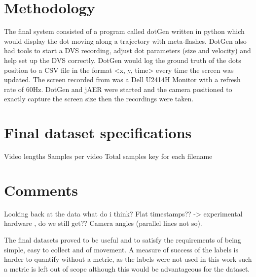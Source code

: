 \section{Methodology}
The final system consisted of a program called dotGen written in python which would display the dot moving along a trajectory with meta-flashes.
DotGen also had tools to start a DVS recording, adjust dot parameters (size and velocity) and help set up the DVS correctly. 
DotGen would log the ground truth of the dots position to a CSV file in the format <x, y, time> every time the screen was updated.
The screen recorded from was a Dell U2414H Monitor with a refresh rate of 60Hz.
DotGen and jAER were started and the camera positioned to exactly capture the screen size then the recordings were taken. 




\section{Final dataset specifications}
Video lengths \hfill
Samples per video \hfill
Total samples \hfill
key for each filename \hfill


\section{Comments}
Looking back at the data what do i think? \hfill
Flat timestamps?? -> experimental hardware , do we still get??\hfill
Camera angles (parallel lines not so).

The final datasets proved to be useful and to satisfy the requirements of being simple, easy to collect and of movement. 
A measure of success of the labels is harder to quantify without a metric, as the labels were not used in this work such a metric is left out of scope although this would be advantageous for the dataset. 


